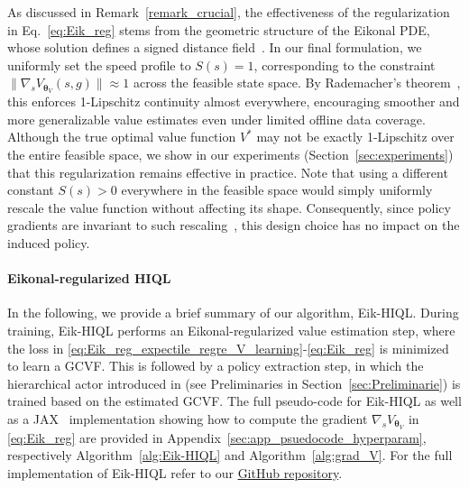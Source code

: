 \documentclass{article}
\theoremstyle{plain}
\theoremstyle{definition}
\theoremstyle{remark}
\begin{document}
As discussed in Remark~\ref{remark_crucial}, the effectiveness of the regularization in Eq.~\eqref{eq:Eik_reg} stems from the geometric structure of the Eikonal PDE, whose solution defines a signed distance field~\cite{nintfields, smith2020eikonet}. In our final formulation, we uniformly set the speed profile to \( S(s) = 1 \), corresponding to the constraint \( \|\nabla_s V_{\bm{\theta}_V}(s, g)\| \approx 1 \) across the feasible state space. By Rademacher’s theorem~\cite{heinonen2005lectures}, this enforces 1-Lipschitz continuity almost everywhere, encouraging smoother and more generalizable value estimates even under limited offline data coverage. Although the true optimal value function \( V^* \) may not be exactly 1-Lipschitz over the entire feasible space, we show in our experiments (Section~\ref{sec:experiments}) that this regularization remains effective in practice. Note that using a different constant \( S(s) > 0 \) everywhere in the feasible space would simply uniformly rescale the value function without affecting its shape. Consequently, since policy gradients are invariant to such rescaling~\cite{sutton1999policy, schulman2015trust, sutton2018reinforcement}, this design choice has no impact on the induced policy. 

\vspace{-0.0cm}
\paragraph{Eikonal-regularized HIQL} In the following, we provide a brief summary of our algorithm, Eik-HIQL. During training, Eik-HIQL performs an Eikonal-regularized value estimation step, where the loss in \eqref{eq:Eik_reg_expectile_regre_V_learning}-\eqref{eq:Eik_reg} is minimized to learn a GCVF. This is followed by a policy extraction step, in which the hierarchical actor introduced in \citet{park2024hiql} (see Preliminaries in Section~\ref{sec:Preliminarie}) is trained based on the estimated GCVF. The full pseudo-code for Eik-HIQL as well as a JAX~\cite{jax2018github} implementation showing how to compute the gradient $\nabla_s V_{\bm{\theta}_V}$ in \eqref{eq:Eik_reg} are provided in Appendix~\ref{sec:app_psuedocode_hyperparam}, respectively Algorithm~\ref{alg:Eik-HIQL} and Algorithm~\ref{alg:grad_V}. For the full implementation of Eik-HIQL refer to our \href{https://anonymous.4open.science/r/Pi-HIQL-F8F3/README.md}{GitHub repository}.

\vspace{-0.0cm}
\end{document}
